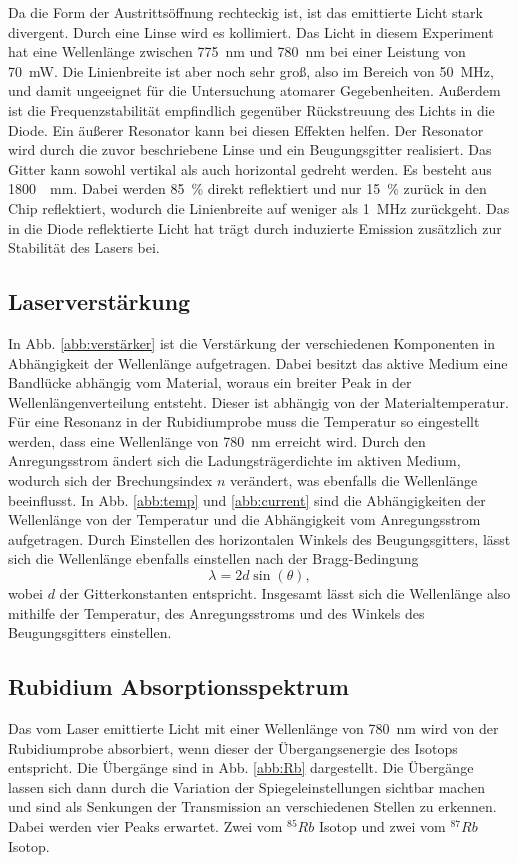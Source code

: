 Da die Form der Austrittsöffnung rechteckig ist, ist das emittierte Licht stark divergent. Durch eine Linse wird es kollimiert. Das Licht in diesem Experiment hat eine Wellenlänge zwischen \SI{775}{\nm} und \SI{780}{\nm} bei einer Leistung von \SI{70}{\mW}. Die Linienbreite ist aber noch sehr groß, also im Bereich von \SI{50}{\MHz}, und damit ungeeignet für die Untersuchung atomarer Gegebenheiten. Außerdem ist die Frequenzstabilität empfindlich gegenüber Rückstreuung des Lichts in die Diode. Ein äußerer Resonator kann bei diesen Effekten helfen.
Der Resonator wird durch die zuvor beschriebene Linse und ein Beugungsgitter realisiert. Das Gitter kann sowohl vertikal als auch horizontal gedreht werden. Es besteht aus \SI{1800}{\per\milli\metre}. Dabei werden \SI{85}{\percent} direkt reflektiert und nur \SI{15}{\percent} zurück in den Chip reflektiert, wodurch die Linienbreite auf weniger als \SI{1}{\MHz} zurückgeht. Das in die Diode reflektierte Licht hat trägt durch induzierte Emission zusätzlich zur Stabilität des Lasers bei. 

\subsection{Laserverstärkung}

In Abb. \ref{abb:verstärker} ist die Verstärkung der verschiedenen Komponenten in Abhängigkeit der Wellenlänge aufgetragen. Dabei besitzt das aktive Medium eine Bandlücke abhängig vom Material, woraus ein breiter Peak in der Wellenlängenverteilung entsteht. Dieser ist abhängig von der Materialtemperatur. Für eine Resonanz in der Rubidiumprobe muss die Temperatur so eingestellt werden, dass eine Wellenlänge von \SI{780}{\nm} erreicht wird. Durch den Anregungsstrom ändert sich die Ladungsträgerdichte im aktiven Medium, wodurch sich der Brechungsindex $n$ verändert, was ebenfalls die Wellenlänge beeinflusst. In Abb. \ref{abb:temp} und \ref{abb:current} sind die Abhängigkeiten der Wellenlänge von der Temperatur und die Abhängigkeit vom Anregungsstrom aufgetragen. Durch Einstellen des horizontalen Winkels des Beugungsgitters, lässt sich die Wellenlänge ebenfalls einstellen nach der Bragg-Bedingung
\begin{equation*}
    \lambda = 2d \sin(\theta),
\end{equation*}
wobei $d$ der Gitterkonstanten entspricht. Insgesamt lässt sich die Wellenlänge also mithilfe der Temperatur, des Anregungsstroms und des Winkels des Beugungsgitters einstellen.



\subsection{Rubidium Absorptionsspektrum}

Das vom Laser emittierte Licht mit einer Wellenlänge von \SI{780}{\nm} wird von der Rubidiumprobe absorbiert, wenn dieser der Übergangsenergie des Isotops entspricht. Die Übergänge sind in Abb. \ref{abb:Rb} dargestellt. Die Übergänge lassen sich dann durch die Variation der Spiegeleinstellungen sichtbar machen und sind als Senkungen der Transmission an verschiedenen Stellen zu erkennen. Dabei werden vier Peaks erwartet. Zwei vom $^85Rb$ Isotop und zwei vom $^87Rb$ Isotop. 